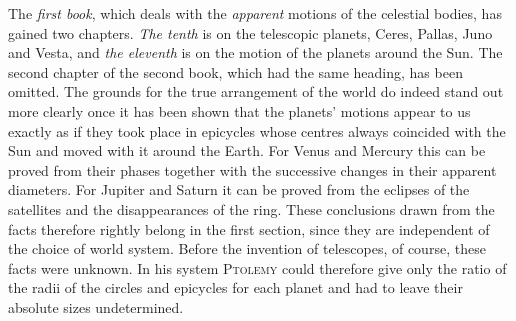 The \emph{first book}, which deals with the \emph{apparent} motions of the celestial bodies, has gained two chapters. \emph{The tenth} is on the telescopic planets, Ceres, Pallas, Juno and Vesta, and \emph{the eleventh} is on the motion of the planets around the Sun. The second chapter of the second book, which had the same heading, has been omitted. The grounds for the true arrangement of the world do indeed stand out more clearly once it has been shown that the planets’ motions appear to us exactly as if they took place in epicycles whose centres always coincided with the Sun and moved with it around the Earth. For Venus and Mercury this can be proved from their phases together with the successive changes in their apparent diameters. For Jupiter and Saturn it can be proved from the eclipses of the satellites and the disappearances of the ring. These conclusions drawn from the facts therefore rightly belong in the first section, since they are independent of the choice of world system. Before the invention of telescopes, of course, these facts were unknown. In his system \textsc{Ptolemy} could therefore give only the ratio of the radii of the circles and epicycles for each planet and had to leave their absolute sizes undetermined.


